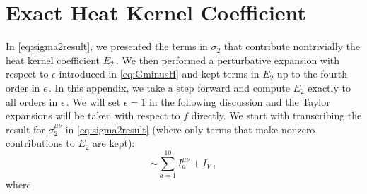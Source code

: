 \documentclass[11pt]{article}
\newcommand{\be}{\begin{equation}}
\newcommand{\ee}{\end{equation}}
\begin{document}
\newpage

\appendix

\section{Exact Heat Kernel Coefficient} \label{app:chkc}

In \eqref{eq:sigma2result}, we presented the terms in $\sigma_2$ that contribute nontrivially the heat kernel coefficient $E_2$\,. 
We then performed a perturbative expansion with respect to $\epsilon$ introduced in \eqref{eq:GminusH} and kept terms in $E_2$ up to the fourth order in $\epsilon$\,. In this appendix, we take a step forward and compute $E_2$ exactly to all orders in $\epsilon$\,. 
We will set $\epsilon = 1$ in the following discussion and the Taylor expansions will be taken with respect to $f$ directly. 
We start with transcribing the result for $\sigma_2^{\mu\nu}$ in \eqref{eq:sigma2result} (where only terms that make nonzero contributions to $E_2$ are kept):
%
\be
	[\sigma_2^{\mu\nu}] \sim \sum_{a=1}^{10} I_a^{\mu\nu} + I_V\,,  
\ee
%
where
%
\end{document}
